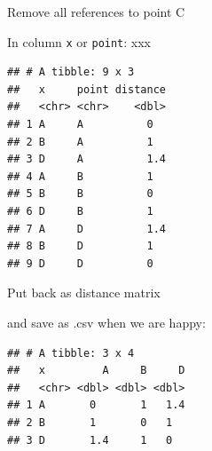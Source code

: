 \documentclass[ignorenonframetext,]{beamer}
\newenvironment{Shaded}{\begin{snugshade}}{\end{snugshade}}
\newcommand{\DecValTok}[1]{\textcolor[rgb]{0.00,0.00,0.81}{#1}}
\newcommand{\KeywordTok}[1]{\textcolor[rgb]{0.13,0.29,0.53}{\textbf{#1}}}
\newcommand{\NormalTok}[1]{#1}
\newcommand{\OperatorTok}[1]{\textcolor[rgb]{0.81,0.36,0.00}{\textbf{#1}}}
\newcommand{\StringTok}[1]{\textcolor[rgb]{0.31,0.60,0.02}{#1}}
\begin{document}
\begin{frame}[fragile]{Remove all references to point C}
\protect\hypertarget{remove-all-references-to-point-c}{}

In column \texttt{x} or \texttt{point}: xxx

\small

\begin{Shaded}
\end{Shaded}

\begin{verbatim}
## # A tibble: 9 x 3
##   x     point distance
##   <chr> <chr>    <dbl>
## 1 A     A          0  
## 2 B     A          1  
## 3 D     A          1.4
## 4 A     B          1  
## 5 B     B          0  
## 6 D     B          1  
## 7 A     D          1.4
## 8 B     D          1  
## 9 D     D          0
\end{verbatim}

\normalsize

\end{frame}

\begin{frame}[fragile]{Put back as distance matrix}
\protect\hypertarget{put-back-as-distance-matrix}{}

and save as .csv when we are happy:

\begin{Shaded}
\end{Shaded}

\begin{verbatim}
## # A tibble: 3 x 4
##   x         A     B     D
##   <chr> <dbl> <dbl> <dbl>
## 1 A       0       1   1.4
## 2 B       1       0   1  
## 3 D       1.4     1   0
\end{verbatim}

\begin{Shaded}
\end{Shaded}

\end{frame}
\end{document}
